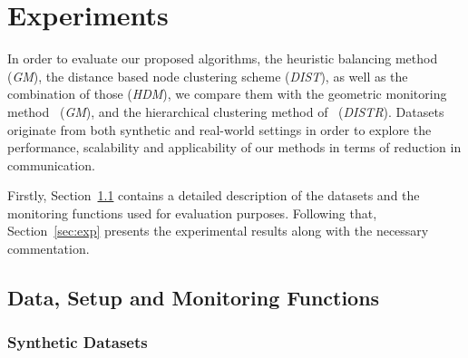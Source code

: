 \chapter{Experiments} \label{chap:exp}

In order to evaluate our proposed algorithms, the heuristic balancing method (\emph{GM}), the distance based node clustering scheme (\emph{DIST}), as well as the combination of those (\emph{HDM}), we compare them with the geometric monitoring method~\cite{Sharfman2006GM} (\emph{GM}), and the hierarchical clustering method of~\cite{Keren2014GMHetStreams} (\emph{DISTR}). Datasets originate from both synthetic and real-world settings in order to explore the performance, scalability and applicability of our methods in terms of reduction in communication.

Firstly, Section~\ref{sec:datasets} contains a detailed description of the datasets and the monitoring functions used for evaluation purposes. Following that, Section~\ref{sec:exp} presents the experimental results along with the necessary commentation.

\section{Data, Setup and Monitoring Functions} \label{sec:datasets}

\subsection{Synthetic Datasets}

